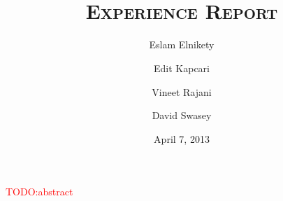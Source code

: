 \documentclass[a4paper]{article}
\title{\TITLE \\
	{\small\textsc{Experience Report}}%
}
\author{Eslam Elnikety \and Edit Kapcari \and Vineet Rajani \and David Swasey}
\date{April 7, 2013}
\newcommand{\todo}[1]{\textcolor{red} {TODO:{#1}} }
\begin{document}
\maketitle

\todo{abstract}






\appendix

\end{document}
